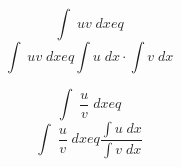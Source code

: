 \documentclass[avery5371,grid]{flashcards}
\begin{document}
\begin{flashcard}{\large \vspace*{\fill} \[ \int\; uv \;dx 
eq \] \vspace*{\fill}   }{\large \vspace*{\fill} \[  \int\; uv \;dx 
eq \int u \;dx \cdot \int v \;dx  \] \vspace*{\fill}   }\end{flashcard}

\begin{flashcard}{\large \vspace*{\fill} \[ \int\; \dfrac{u}{v} \;dx 
eq \] \vspace*{\fill}   }{\large \vspace*{\fill} \[  \int\;\dfrac{u}{v} \;dx 
eq \dfrac{\int u \; dx}{\int v \;dx}  \] \vspace*{\fill}   }\end{flashcard}
\end{document}
